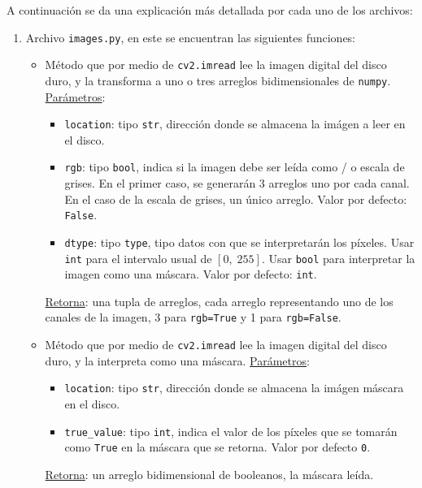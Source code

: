 A continuaci\'on se da una explicaci\'on m\'as detallada por cada uno de los archivos:
\begin{enumerate}
	\item Archivo \texttt{images.py}, en este se encuentran las siguientes funciones:
	\begin{itemize}
		\item {}
		
		M\'etodo que por medio de \texttt{cv2.imread} lee la imagen digital del disco duro, y la transforma a uno o tres arreglos bidimensionales de \texttt{numpy}. \underline{Par\'ametros}:
		\begin{itemize}
			\item \texttt{location}: tipo \texttt{str}, direcci\'on donde se almacena la im\'agen a leer en el disco.
			\item \texttt{rgb}: tipo \texttt{bool}, indica si la imagen debe ser le\'ida como \RGB/ o escala de grises. En el primer caso, se generar\'an 3 arreglos uno por cada canal. En el caso de la escala de grises, un \'unico arreglo. Valor por defecto: \texttt{False}.
			\item \texttt{dtype}: tipo \texttt{type}, tipo datos con que se interpretar\'an los p\'ixeles. Usar \texttt{int} para el intervalo usual de $[0,\; 255]$. Usar \texttt{bool} para interpretar la imagen como una m\'ascara. Valor por defecto: \texttt{int}.
		\end{itemize}
		\underline{Retorna}: una tupla de arreglos, cada arreglo representando uno de los canales de la imagen, 3 para \texttt{rgb=True} y 1 para \texttt{rgb=False}.
		
		\item {}
		
		 M\'etodo que por medio de \texttt{cv2.imread} lee la imagen digital del disco duro, y la interpreta como una m\'ascara. \underline{Par\'ametros}:
		\begin{itemize}
			\item \texttt{location}: tipo \texttt{str}, direcci\'on donde se almacena la im\'agen m\'ascara en el disco.
			\item \texttt{true\_value}: tipo \texttt{int}, indica el valor de los p\'ixeles que se tomar\'an como \texttt{True} en la m\'ascara que se retorna. Valor por defecto \texttt{0}.
		\end{itemize}
		\underline{Retorna}: un arreglo bidimensional de booleanos, la m\'ascara leída.
		

\end{itemize}
\end{enumerate}
